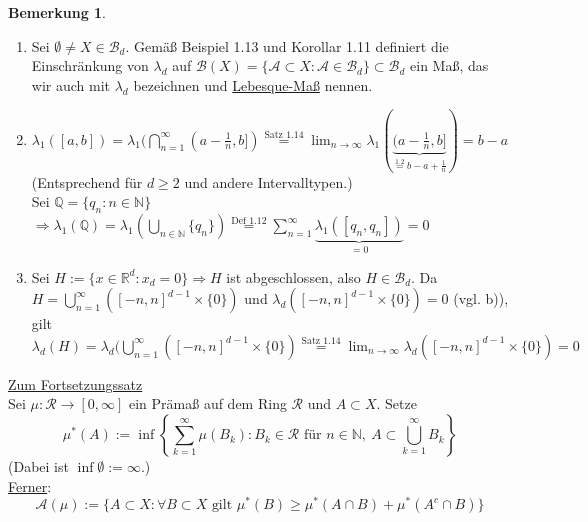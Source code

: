\documentclass[a4paper]{scrreprt}
\newcommand{\R}{\mathbb{R}}
\newcommand{\N}{\mathbb{N}}
\newcommand{\Q}{\mathbb{Q}}
\newcommand{\Borel}{\mathcal{B}}
\newcommand{\toInf}{\rightarrow \infty}
\newcommand{\limToInf}[1]{\lim_{#1 \toInf}}
\newcommand{\Bd}{\Borel_d}
\newcommand{\jlabel}[1]{\label{j_#1}}
\newcommand{\jshortlink}[1]{\jhyperref{#1}{\text{#1}}}
\newcommand{\jhyperref}[2]{\hyperref[j_#1]{#2}}
\theoremstyle{plain}
\theoremstyle{definition}
\newtheorem{bem}[thm]{Bemerkung}
\begin{document}
{{{\jlabel{Bem 1.21}
\begin{bem}
    \begin{enumerate}
        \item Sei $\emptyset \neq X \in \Bd$. Gemäß Beispiel 1.13 und Korollar 1.11 definiert die Einschränkung von $\lambda_d$ auf $\Borel(X)=\{\mathcal{A} \subset X: \mathcal{A} \in \Bd \}\subset \Bd$ ein Maß, das wir auch mit $\lambda_d$ bezeichnen und \uline{Lebesque-Maß} nennen.
        \item $\lambda_1([a,b]) = \lambda_1(\bigcap_{n=1}^\infty (a-\frac{1}{n},b]) \overset{\jshortlink{Satz 1.14}}{=} \limToInf{n} \lambda_1(\underbrace{(a-\frac{1}{n}, b]}_{\overset{\text{1.2}}{=} b-a+\frac{1}{n}}) = b-a$\\
        (Entsprechend für $d\ge2$ und andere Intervalltypen.)\\
        Sei $\Q = \{q_n : n\in\N\}$\\$\Rightarrow \lambda_1(\Q) = \lambda_1(\bigcup_{n\in\N} \{q_n\}) \overset{\jshortlink{Def 1.12}}{=} \sum_{n=1}^\infty \underbrace{\lambda_1([q_n, q_n])}_{=0} = 0$
        \item Sei $H := \{x \in \R^d : x_d = 0\} \Rightarrow H$ ist abgeschlossen, also $H\in \Bd$. Da $H=\bigcup_{n=1}^\infty ([-n,n]^{d-1} \times \{0\})$ und $\lambda_d([-n,n]^{d-1} \times \{0\}) = 0$ (vgl. b)), gilt $\lambda_d(H) = \lambda_d(\bigcup_{n=1}^\infty ([-n,n]^{d-1} \times \{0\}) \overset{\jshortlink{Satz 1.14}}{=} \limToInf{n} \lambda_d([-n,n]^{d-1} \times \{0\}) = 0$
    \end{enumerate}
\end{bem}
\uline{Zum Fortsetzungssatz}\\
Sei $\mu: \mathcal{R} \rightarrow [0,\infty]$ ein Prämaß auf dem Ring $\mathcal{R}$ und $A\subset X$. Setze
\jlabel{(1.8)}
\begin{equation}
    \mu^*(A) := \inf \left \{\sum_{k=1}^\infty \mu(B_k) : B_k \in \mathcal{R} \text{ für } n\in\N,\ A \subset \bigcup_{k=1}^\infty B_k \right \}    
\end{equation}
(Dabei ist $\inf \emptyset := \infty$.)\\
\uline{Ferner}:
\jlabel{(1.9)}
\begin{equation}
    \mathcal{A}(\mu) := \{A \subset X: \forall B \subset X \text{ gilt }\mu^*(B)\ge \mu^*(A\cap B) + \mu^*(A^c\cap B) \}
\end{equation}

}}}
\end{document}
